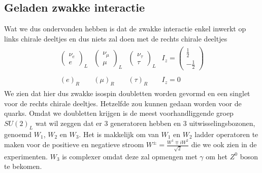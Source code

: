 \documentclass[../main.tex]{subfiles}
\begin{document}
\subsection{Geladen zwakke interactie}%
\label{sub:geladen_zwakke_interactie}

Wat we dus ondervonden hebben is dat de zwakke interactie enkel inwerkt op links chirale deeltjes en dus niets zal doen met de rechts chirale deeltjes
\begin{equation}
    \begin{aligned}
        \label{eq:zwakke_families}
        \begin{matrix}
            \begin{pmatrix}
                \nu_e\\
                e
            \end{pmatrix}_L &
            \begin{pmatrix}
                \nu_\mu\\
                \mu
            \end{pmatrix}_L &
            \begin{pmatrix}
                \nu_\tau\\
                \tau
            \end{pmatrix}_L &
            I_z=
            \begin{pmatrix}
                \frac{1}{2}\\
                -\frac{1}{2}
            \end{pmatrix}\\
            &&&\\
        (e)_R & (\mu)_R & (\tau)_R & I_z = 0
        \end{matrix}
    \end{aligned}
\end{equation}
We zien dat hier dus zwakke isospin doubletten worden gevormd en een singlet voor de rechts chirale deeltjes. Hetzelfde zou kunnen gedaan worden voor de quarks. Omdat we doubletten krijgen is de meest voorhandliggende groep $SU(2)_L$ wat wil zeggen dat er 3 generatoren hebben en 3 uitwisselingsbozonen, genoemd $W_1$, $W_2$ en $W_3$. Het is makkelijk om van $W_1$ en $W_2$ ladder operatoren te maken voor de positieve en negatieve stroom $W^\pm = \frac{W^1\mp iW^2}{\sqrt{2}}$ die we ook zien in de experimenten. $W_3$ is complexer omdat deze zal opmengen met $\gamma$ om het $Z^0$ boson te bekomen.
\end{document}
